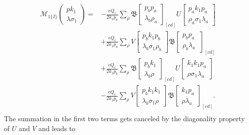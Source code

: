 \begin{align}
\mathcal{M}_{1\{I\}}\left(\begin{array}{c}
pk_1\\\lambda\sigma_1
\end{array}\right)
=&-\frac{eQ_e}{2k_1p_a}\sum_\rho\mathfrak{B}\left[\begin{array}{c}
p_bp_a\\\lambda_b\rho_a
\end{array}\right]_{[cd]}U\left[\begin{array}{c}
p_ak_1p_a\\\rho_a\sigma_1\lambda_a
\end{array}\right]\nonumber\\
&+\frac{eQ_e}{2k_1p_a}\sum_\rho V\left[\begin{array}{c}
p_bk_1p_b\\\lambda_b\sigma_1\rho_b
\end{array}\right]
\mathfrak{B}\left[\begin{array}{c}
p_bp_a\\\rho_b\lambda_a\
\end{array}\right]_{[cd]}\nonumber\\
&+\frac{eQ_e}{2k_1p_b}\sum_\rho\mathfrak{B}\left[\begin{array}{c}
p_bk_1\\\lambda_b\rho
\end{array}\right]_{[cd]}U\left[\begin{array}{c}
k_1k_1p_a\\\rho\sigma_1\lambda_a
\end{array}\right]\nonumber\\
&-\frac{eQ_e}{2k_1p_b}\sum_\rho V\left[\begin{array}{c}
p_bk_1k_1\\\lambda_b\sigma_1\rho
\end{array}\right]
\mathfrak{B}\left[\begin{array}{c}
k_1p_a\\\rho\lambda_a\
\end{array}\right]_{[cd]}.\nonumber\\
\end{align}
The summation in the first two terms gets canceled by the diagonality property of $U$ and $V$ and leads to
